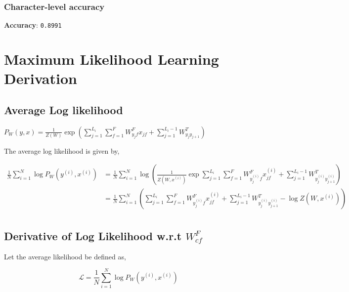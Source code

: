 \documentclass[11pt]{article}
\newcommand{\suml}[2]{\sum\limits_{#1}^{#2}}
\begin{document}
\subsubsection{Character-level accuracy}

\textbf{Accuracy}: \texttt{0.8991}

\clearpage
\section{Maximum Likelihood Learning Derivation}

\subsection{Average Log likelihood}

$P_W (y, x) = \frac{1}{Z(W)} \exp \left( \suml{j=1}{L_i} \suml{f=1}{F} W_{y_j f}^F x_{jf} + \suml{j=1}{L_i - 1} W_{y_j y_{j + 1}}^T \right)$

The average log likelihood is given by,

\begin{equation}
    \begin{aligned}
        \frac{1}{N} \suml{i=1}{N} \log P_W(y^{(i)}, x^{(i)}) &= \frac{1}{N} \suml{i=1}{N}  \log \left( \frac{1}{Z(W, x^{(i)})} \exp \suml{j=1}{L_i} \suml{f=1}{F} W_{y_j^{(i)} f}^F x_{jf}^{(i)} + \suml{j=1}{L_i - 1} W_{y_j^{(i)} y_{j + 1}^{(i)}}^T \right) \\
        &= \frac{1}{N} \suml{i=1}{N} \left( \suml{j=1}{L_i} \suml{f=1}{F} W_{y_j^{(i)} f}^F x_{jf}^{(i)} + \suml{j=1}{L_i - 1} W_{y_j^{(i)} y_{j + 1}^{(i)}}^T - \log Z(W, x^{(i)}) \right) \\
    \end{aligned}
\end{equation}

\subsection{Derivative of Log Likelihood w.r.t $W_{cf}^F$}

Let the average likelihood be defined as,

\begin{equation}
    \mathcal{L} = \frac{1}{N} \suml{i=1}{N} \log P_W(y^{(i)}, x^{(i)})
\end{equation}
\end{document}
